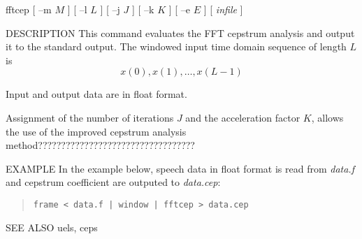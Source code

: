 
\begin{synopsis}
\item[fftcep] [ --m $M$ ] [ --l $L$ ] [ --j $J$ ] [ --k $K$ ] 
	    [ --e $E$ ] [ {\em infile} ] 
\end{synopsis}

\begin{qsection}{DESCRIPTION}
This command evaluates the FFT cepstrum analysis
and output it to the standard output.
The windowed input time domain sequence of length $L$ is
\begin{displaymath}
  x(0),x(1),\ldots,x(L-1)
\end{displaymath}
\par
Input and output data are in float format.
\par
Assignment of the number of iterations $J$ and
the acceleration factor $K$, allows the use of the improved cepstrum
analysis method??????????????????????????????????
\end{qsection}

\begin{options}
\end{options}

\begin{qsection}{EXAMPLE}
In the example below, speech data in float format is read from
{\em data.f} and cepstrum coefficient are outputed to {\em data.cep}:
\begin{quote}
  \verb!frame < data.f | window | fftcep > data.cep !
\end{quote}
\end{qsection}

\begin{qsection}{SEE ALSO}
  uels, ceps
\end{qsection}
